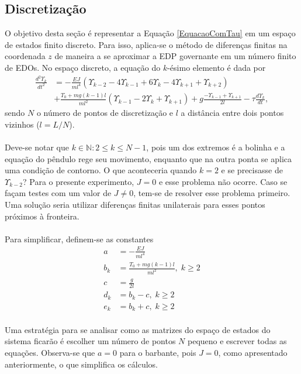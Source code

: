 \subsection{Discretização}
O objetivo desta seção é representar a Equação \ref{EquacaoComTau} em um espaço de estados finito discreto.  Para isso, aplica-se o método de diferenças finitas na coordenada $z$ de maneira a se aproximar a EDP governante em um número finito de EDOs. No espaço discreto, a equação do $k$-ésimo elemento é dada por \begin{align}
	\frac{d^2\Upsilon_k}{dt^2} &= -\frac{EJ}{m l^4}\left(\Upsilon_{k-2} - 4\Upsilon_{k-1}+6\Upsilon_{k}-4\Upsilon_{k+1}+\Upsilon_{k+2}\right)\nonumber\\
	&+ \frac{T_0+mg(k-1)l}{m l^2}\left(\Upsilon_{k-1}-2\Upsilon_{k} + \Upsilon_{k+1}\right)+g\frac{-\Upsilon_{k-1}+\Upsilon_{k+1}}{2l}-\tau\frac{d\Upsilon_k}{dt},
\end{align} sendo $N$ o número de pontos de discretização e $l$ a distância entre dois pontos vizinhos ($l = L/N$).

\paragraph{} Deve-se notar que $k\in \mathbb{N}:2\le k \le N-1$, pois um dos extremos é a bolinha e a equação do pêndulo rege seu movimento, enquanto que na outra ponta se aplica uma condição de contorno. O que aconteceria quando $k=2$ e se precisasse de $\Upsilon_{k-2}$? Para o presente experimento, $J=0$ e esse problema não ocorre. Caso se façam testes com um valor de $J\neq 0$, tem-se de resolver esse problema primeiro. Uma solução seria utilizar diferenças finitas unilaterais para esses pontos próximos à fronteira.

\paragraph{} Para simplificar, definem-se as constantes \begin{align}
	a &= -\frac{EJ}{m l^4}\\
	b_k &= \frac{T_0 + mg(k-1)l}{m l^2},\; k\ge 2\\
	c &= \frac{g}{2l}\\
	d_k &= b_k - c,\; k\ge 2\\
	e_k &= b_k + c,\; k\ge 2
\end{align}

\paragraph{} Uma estratégia para se analisar como as matrizes do espaço de estados do sistema ficarão é escolher um número de pontos $N$ pequeno e escrever todas as equações. Observa-se que $a=0$ para o barbante, pois $J=0$, como apresentado anteriormente, o que simplifica os cálculos.

